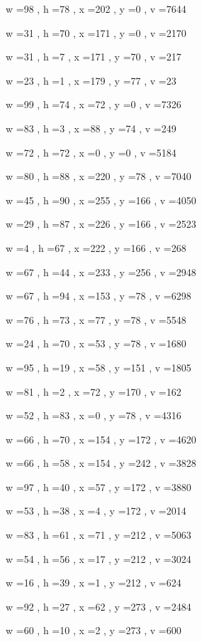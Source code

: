 \documentclass[11pt]{article}
\begin{document}
w =98 , h =78 , x =202 , y =0 , v =7644
\par
w =31 , h =70 , x =171 , y =0 , v =2170
\par
w =31 , h =7 , x =171 , y =70 , v =217
\par
w =23 , h =1 , x =179 , y =77 , v =23
\par
w =99 , h =74 , x =72 , y =0 , v =7326
\par
w =83 , h =3 , x =88 , y =74 , v =249
\par
w =72 , h =72 , x =0 , y =0 , v =5184
\par
w =80 , h =88 , x =220 , y =78 , v =7040
\par
w =45 , h =90 , x =255 , y =166 , v =4050
\par
w =29 , h =87 , x =226 , y =166 , v =2523
\par
w =4 , h =67 , x =222 , y =166 , v =268
\par
w =67 , h =44 , x =233 , y =256 , v =2948
\par
w =67 , h =94 , x =153 , y =78 , v =6298
\par
w =76 , h =73 , x =77 , y =78 , v =5548
\par
w =24 , h =70 , x =53 , y =78 , v =1680
\par
w =95 , h =19 , x =58 , y =151 , v =1805
\par
w =81 , h =2 , x =72 , y =170 , v =162
\par
w =52 , h =83 , x =0 , y =78 , v =4316
\par
w =66 , h =70 , x =154 , y =172 , v =4620
\par
w =66 , h =58 , x =154 , y =242 , v =3828
\par
w =97 , h =40 , x =57 , y =172 , v =3880
\par
w =53 , h =38 , x =4 , y =172 , v =2014
\par
w =83 , h =61 , x =71 , y =212 , v =5063
\par
w =54 , h =56 , x =17 , y =212 , v =3024
\par
w =16 , h =39 , x =1 , y =212 , v =624
\par
w =92 , h =27 , x =62 , y =273 , v =2484
\par
w =60 , h =10 , x =2 , y =273 , v =600
\par
\newpage
\end{document}
